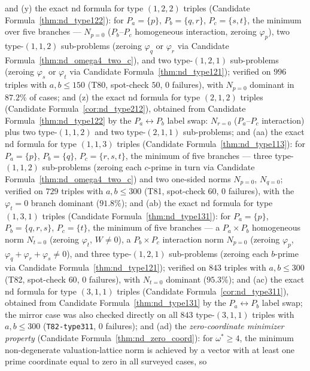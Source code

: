 \documentclass[12pt]{article}
\theoremstyle{definition}
\begin{document}
and (y) the exact $\mathrm{nd}$ formula for type $(1,2,2)$ triples
(Candidate Formula~\ref{thm:nd_type122}): for $P_a=\{p\}$, $P_b=\{q,r\}$, $P_c=\{s,t\}$,
the minimum over five branches — $N_{p=0}$ ($P_b$--$P_c$ homogeneous interaction,
zeroing $\varphi_p$), two type-$(1,1,2)$ sub-problems (zeroing $\varphi_q$ or
$\varphi_r$ via Candidate Formula~\ref{thm:nd_omega4_two_c}), and two type-$(1,2,1)$
sub-problems (zeroing $\varphi_s$ or $\varphi_t$ via Candidate Formula~\ref{thm:nd_type121});
verified on $996$ triples with $a, b \le 150$ (T80, spot-check $50$, $0$ failures),
with $N_{p=0}$ dominant in $87.2\%$ of cases;
and (z) the exact $\mathrm{nd}$ formula for type $(2,1,2)$ triples
(Candidate Formula~\ref{cor:nd_type212}), obtained from Candidate Formula~\ref{thm:nd_type122} by the
$P_a \leftrightarrow P_b$ label swap: $N_{r=0}$ ($P_a$--$P_c$ interaction) plus two
type-$(1,1,2)$ and two type-$(2,1,1)$ sub-problems;
and (aa) the exact $\mathrm{nd}$ formula for type $(1,1,3)$ triples
(Candidate Formula~\ref{thm:nd_type113}): for $P_a=\{p\}$, $P_b=\{q\}$, $P_c=\{r,s,t\}$,
the minimum of five branches — three type-$(1,1,2)$ sub-problems (zeroing each
$c$-prime in turn via Candidate Formula~\ref{thm:nd_omega4_two_c}) and two one-sided norms
$N_{p=0}$, $N_{q=0}$; verified on $729$ triples with $a,b \le 300$
(T81, spot-check $60$, $0$ failures), with the $\varphi_t=0$ branch dominant ($91.8\%$);
and (ab) the exact $\mathrm{nd}$ formula for type $(1,3,1)$ triples
(Candidate Formula~\ref{thm:nd_type131}): for $P_a=\{p\}$, $P_b=\{q,r,s\}$, $P_c=\{t\}$,
the minimum of five branches — a $P_a\times P_b$ homogeneous norm $N_{t=0}$
(zeroing $\varphi_t$, $W \ne 0$), a $P_b\times P_c$ interaction norm $N_{p=0}$
(zeroing $\varphi_p$, $\varphi_q+\varphi_r+\varphi_s \ne 0$), and three
type-$(1,2,1)$ sub-problems (zeroing each $b$-prime via Candidate Formula~\ref{thm:nd_type121});
verified on $843$ triples with $a,b \le 300$ (T82, spot-check $60$, $0$ failures),
with $N_{t=0}$ dominant ($95.3\%$);
and (ac) the exact $\mathrm{nd}$ formula for type $(3,1,1)$ triples
(Candidate Formula~\ref{cor:nd_type311}), obtained from Candidate Formula~\ref{thm:nd_type131}
by the $P_a \leftrightarrow P_b$ label swap; the mirror case was also checked
directly on all $843$ type-$(3,1,1)$ triples with $a,b\le300$
(\texttt{T82-type311}, $0$ failures);
and (ad) the \emph{zero-coordinate minimizer property}
(Candidate Formula~\ref{thm:nd_zero_coord}): for $\omega^*\ge 4$, the minimum
non-degenerate valuation-lattice norm is achieved by a vector with at least one
prime coordinate equal to zero in all surveyed cases, so
\end{document}
